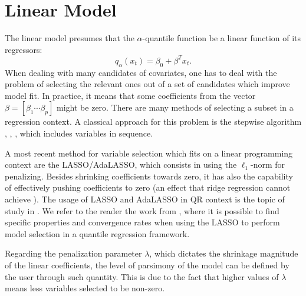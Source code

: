 

\section{Linear Model}

The linear model presumes that the $\alpha$-quantile function be a linear function of its regressors:
$$q_{\alpha}(x_t) = \beta_{0} + \beta^T x_t.$$   
When dealing with many candidates of covariates, one has to deal with the problem of selecting the relevant ones out of a set of candidates which improve model fit. In practice, it means that some coefficients from the vector $\beta = [ \beta_{1 } \cdots \beta_{p} ]$ might be zero.
There are many methods of selecting a subset in a regression context.
A classical approach for this problem is the stepwise algorithm \cite{efroymson1960multiple}, \cite{hocking_selection_1967}, \cite{tibshirani1996regression}, which includes variables in sequence. 

A most recent method for variable selection which fits on a linear programming context are the LASSO/AdaLASSO, which consists in using the $\ell_1$-norm for penalizing. Besides shrinking coefficients towards zero, it has also the capability of effectively pushing coefficients to zero (an effect that ridge regression cannot achieve \cite{tibshirani1996regression}). The usage of LASSO and AdaLASSO in QR context is the topic of study in \cite{li_l1-norm_2008,ciuperca_adaptive_2016,belloni_l1-penalized_2009,zou_regularized_2008,jiang_interquantile_2014}.
We refer to the reader the work from \cite{belloni_l1-penalized_2009}, where it is possible to find specific properties and convergence rates when using the LASSO to perform model selection in a quantile regression framework. 

Regarding the penalization parameter $\lambda$, which dictates the shrinkage magnitude of the linear coefficients, the level of parsimony of the model can be defined by the user through such quantity. This is due to the fact that higher values of $\lambda$ means less variables selected to be non-zero. 

